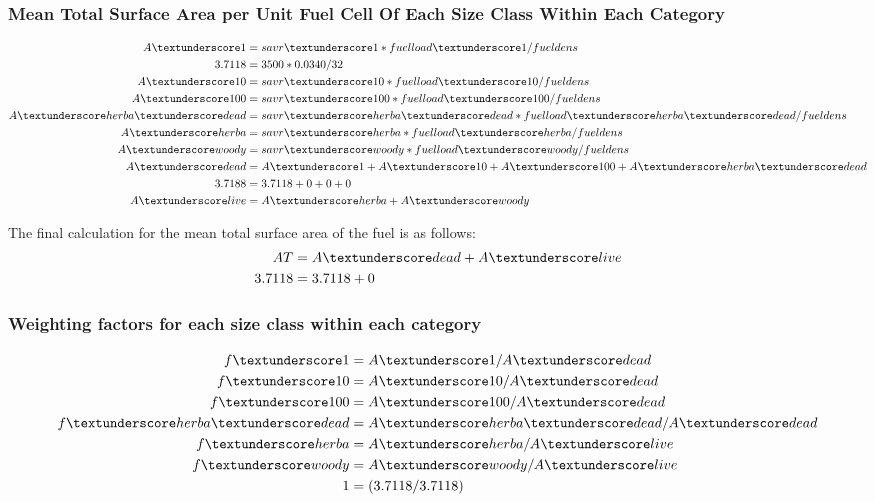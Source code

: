 \documentclass{article}
\newcommand\und{\textunderscore}
\begin{document}
\subsubsection{Mean Total Surface Area per Unit Fuel Cell Of Each Size Class Within Each Category}
\begin{equation}
	\label{mean_total_surface_area}
	\begin{split}
		A\textunderscore 1    &= savr\textunderscore 1 * fuelload\textunderscore 1 / fueldens \\
				3.7118 &= 3500 * 0.0340 / 32 \\
		A\textunderscore 10    &= savr\textunderscore 10 * fuelload\textunderscore 10 / fueldens \\
		A\textunderscore 100   &= savr\textunderscore 100 * fuelload\textunderscore 100 / fueldens \\
		A\textunderscore herba\textunderscore dead  &= savr\textunderscore herba\textunderscore dead * fuelload\textunderscore herba\textunderscore dead / fueldens \\
		A\textunderscore herba &= savr\textunderscore herba * fuelload\textunderscore herba / fueldens \\
		A\textunderscore woody &= savr\textunderscore woody * fuelload\textunderscore woody / fueldens \\
		A\und dead        &= A\und1 + A\und10 + A\und100 + A\und herba\und dead \\
				3.7188 &= 3.7118 + 0 + 0 + 0 \\
		A\und live        &= A\und herba + A\und woody 
	\end{split}
\end{equation}


The final calculation for the mean total surface area of the fuel is as follows: 
\begin{equation}
	\label{mean_SAVR}
	\begin{split}
		AT            &= A\und dead + A\und live \\ 
		3.7118 &= 3.7118 + 0
	\end{split}
\end{equation}



\subsubsection{Weighting factors for each size class within each category}
\begin{equation}
	\label{size_class}
	\begin{split}
		f\und 1           &= A\und 1 / A\und dead \\
		f\und 10          &= A\und 10 / A\und dead \\
		f\und 100         &= A\und 100 / A\und dead \\
		f\und herba\und dead  &= A\und herba\und dead / A\und dead \\
		f\und herba       &= A\und herba / A\und live \\
		f\und woody       &= A\und woody / A\und live \\
		1 &= (3.7118 / 3.7118)
	\end{split}
\end{equation}
\end{document}
